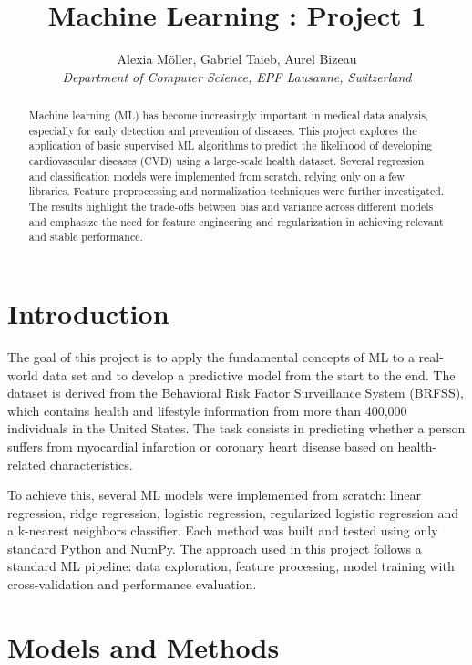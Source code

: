 \documentclass[10pt,conference,compsocconf]{IEEEtran}
\begin{document}
\title{Machine Learning : Project 1}

\author{
  Alexia Möller, Gabriel Taieb, Aurel Bizeau\\
  \textit{Department of Computer Science, EPF Lausanne, Switzerland}
}

\maketitle

\begin{abstract}
  Machine learning (ML) has become increasingly important in medical data analysis, especially for early detection and prevention of diseases. This project explores the application of basic supervised ML algorithms to predict the likelihood of developing cardiovascular diseases (CVD) using a large-scale health dataset. Several regression and classification models were implemented from scratch, relying only on a few libraries. Feature preprocessing and normalization techniques were further investigated. The results highlight the trade-offs between bias and variance across different models and emphasize the need for feature engineering and regularization in achieving relevant and stable performance.
\end{abstract}

\section{Introduction}

The goal of this project is to apply the fundamental concepts of ML to a real-world data set and to develop a predictive model from the start to the end. The dataset is derived from the Behavioral Risk Factor Surveillance System (BRFSS), which contains health and lifestyle information from more than 400,000 individuals in the United States. The task consists in predicting whether a person suffers from myocardial infarction or coronary heart disease based on health-related characteristics. 

To achieve this, several ML models were implemented from scratch: linear regression, ridge regression, logistic regression, regularized logistic regression and a k-nearest neighbors classifier. Each method was built and tested using only standard Python and NumPy. The approach used in this project follows a standard ML pipeline: data exploration, feature processing, model training with cross-validation and performance evaluation.

\section{Models and Methods}
\label{sec:models-methods}
\end{document}
